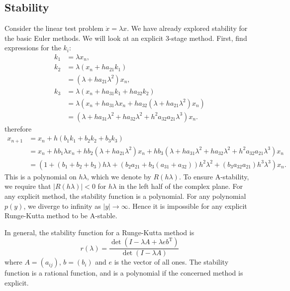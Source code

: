 \documentclass{report}
\theoremstyle{exampstyle} \newtheorem{example}[theorem]{Example}
\theoremstyle{exampstyle} \newtheorem{remark}[theorem]{Remark}
\theoremstyle{exampstyle} \newtheorem{definition}[theorem]{Definition}
\theoremstyle{exampstyle} \newtheorem{lemma}[theorem]{Lemma}
\begin{document}
\subsection{Stability}
Consider the linear test problem $\dot{x} = \lambda x$.
We have already explored stability for the basic Euler methods.
We will look at an explicit 3-stage method.
First, find expressions for the $k_i$:
\begin{align*}
	k_1 &= \lambda x_n, \\
	k_2 &= \lambda\left( x_n + h a_{21}k_1 \right) \\
	&= \left( \lambda + h a_{21}\lambda^2 \right)x_n, \\
	k_3 &= \lambda \left( x_n + h a_{31}k_1 + h a_{32}k_2 \right) \\
	&= \lambda \left( x_n + h a_{31} \lambda x_n + h a_{32}\left( \lambda + h a_{21} \lambda^2 \right) x_n \right) \\
	&= \left( \lambda + h a_{31}\lambda^2 + h a_{32}\lambda^2 + h^2 a_{32}a_{21}\lambda^3 \right) x_n.
\end{align*}
therefore
\begin{align*}
	x_{n+1} &= x_n + h \left( b_1 k_1 + b_2 k_2 + b_3 k_3 \right) \\
	&= x_n + h b_1 \lambda x_n + h b_2 \left(\lambda + h a_{21} \lambda^2\right)x_n + hb_3 \left( \lambda + h a_{31} \lambda^2 + h a_{32} \lambda ^2 + h^2 a_{32} a_{21} \lambda^3\right)x_n \\
	&= \left(
		1 + \left( b_1 + b_2 + b_3 \right) h\lambda + \left(
			b_2 a_{21} + b_3 (a_{31} + a_{32})
		\right)h^2\lambda^2 + \left(
			b_3 a_{32} a_{21}
		\right)h^3\lambda^3
	\right)x_n.
\end{align*}
This is a polynomial on $h\lambda$, which we denote by $R(h\lambda)$.
To ensure A-stability, we require that $|R(h\lambda)| < 0$ for $h \lambda$ in the left half of the complex plane.
For any explicit method, the stability function is a polynomial.
For any polynomial $p(y)$, we diverge to infinity as $|y| \rightarrow \infty$.
Hence it is impossible for any explicit Runge-Kutta method to be A-stable.

In general, the stability function for a Runge-Kutta method is
\begin{equation*}
	r(\lambda) = \frac{\det(I - \lambda A + \lambda eb^\mathrm{T})}{\det(I - \lambda A)}
\end{equation*} %
where $A = (a_{ij})$, $b = (b_i)$ and $e$ is the vector of all ones.
The stability function is a rational function, and is a polynomial if the concerned method is explicit.
\end{document}
